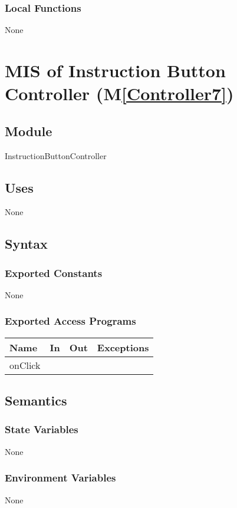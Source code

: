 \documentclass[12pt, titlepage]{article}
\newcommand{\mref}[1]{M\ref{#1}}
\begin{document}
\subsubsection{Local Functions}
None
\newpage

\section{MIS of Instruction Button Controller (\mref{Controller7})} 

\subsection{Module}
InstructionButtonController

\subsection{Uses}
None
\subsection{Syntax}

\subsubsection{Exported Constants}
None

\subsubsection{Exported Access Programs}
\begin{center}
\begin{tabular}{|p{3cm}|p{4cm}|p{4cm}| p{5cm}|}
\hline
\textbf{Name} & \textbf{In} & \textbf{Out} & \textbf{Exceptions} \\
\hline
 onClick& &  & \\
\hline
\end{tabular}
\end{center}

\subsection{Semantics}
\subsubsection{State Variables}
None
\subsubsection{Environment Variables}
None
\end{document}
